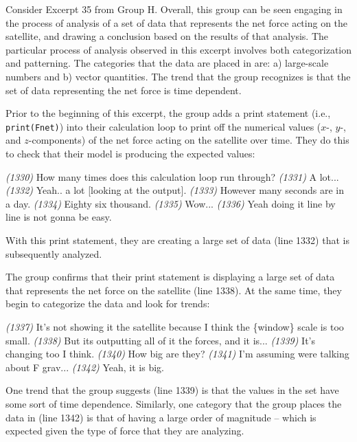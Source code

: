 \documentclass{msuphddissertation}
\begin{document}
\begin{doublespace}
Consider Excerpt 35 from Group H.  Overall, this group can be seen engaging in the process of analysis of a set of data that represents the net force acting on the satellite, and drawing a conclusion based on the results of that analysis.  The particular process of analysis observed in this excerpt involves both categorization and patterning.  The categories that the data are placed in are: a) large-scale numbers and b) vector quantities.  The trend that the group recognizes is that the set of data representing the net force is time dependent.

Prior to the beginning of this excerpt, the group adds a print statement (i.e., \texttt{print(Fnet)}) into their calculation loop to print off the numerical values ($x$-, $y$-, and $z$-components) of the net force acting on the satellite over time.  They do this to check that their model is producing the expected values:  \begin{description}
\SD \textit{(1330)} How many times does this {calculation loop} run through?
\SB \textit{(1331)} A lot...		
\SD \textit{(1332)} Yeah.. a lot [looking at the output].
\SB \textit{(1333)} However many seconds are in a day.
\SA \textit{(1334)} Eighty six thousand.
\SD \textit{(1335)} Wow...
\SB \textit{(1336)} Yeah doing it line by line is not gonna be easy.
\end{description}  With this print statement, they are creating a large set of data (line 1332) that is subsequently analyzed.

The group confirms that their print statement is displaying a large set of data that represents the net force on the satellite (line 1338).  At the same time, they begin to categorize the data and look for trends:  \begin{description}
\SD \textit{(1337)} It's not showing it {the satellite} because I think the \{window\} scale is too small.
\SD \textit{(1338)} But its outputting all of it {the forces}, and it is...
\SD \textit{(1339)} It's changing too I think.
\SB \textit{(1340)} How big are they?		
\SB \textit{(1341)} I'm assuming were talking about F grav...
\SC \textit{(1342)} Yeah, it is big.
\end{description}  One trend that the group suggests (line 1339) is that the values in the set have some sort of time dependence.  Similarly, one category that the group places the data in (line 1342) is that of having a large order of magnitude -- which is expected given the type of force that they are analyzing.


\end{doublespace}
\end{document}
